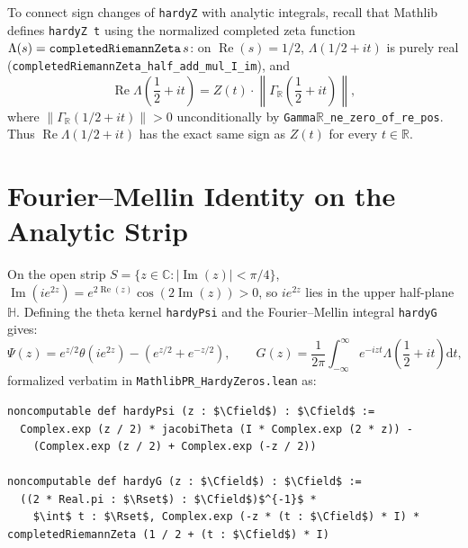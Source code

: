\documentclass[11pt,a4paper]{article}
\theoremstyle{definition}
\newcommand{\dee}{\mathrm{d}}
\newcommand{\Rset}{\mathbb{R}}
\newcommand{\Cfield}{\mathbb{C}}
\begin{document}
To connect sign changes of \texttt{hardyZ} with analytic integrals, recall that Mathlib defines \texttt{hardyZ t} using the normalized completed zeta function $\Lambda(s) = \text{\texttt{completedRiemannZeta}}\, s$: on $\operatorname{Re}(s) = 1/2$, $\Lambda(1/2 + it)$ is purely real (\texttt{completedRiemannZeta\_\allowbreak half\_\allowbreak add\_\allowbreak mul\_I\_im}), and
\begin{equation}\label{eq:lambda_hardyZ}
\operatorname{Re}\Lambda\!\left(\frac{1}{2} + it\right) = Z(t) \cdot \left\|\Gamma_{\Rset}\!\left(\frac{1}{2} + it\right)\right\|,
\end{equation}
where $\|\Gamma_{\Rset}(1/2 + it)\| > 0$ unconditionally by \texttt{Gamma$\Rset$\_ne\_zero\_of\_re\_pos}. Thus $\operatorname{Re}\Lambda(1/2+it)$ has the exact same sign as $Z(t)$ for every $t \in \Rset$.

\section{Fourier--Mellin Identity on the Analytic Strip}\label{sec:strip}

On the open strip $S = \{z \in \Cfield : |\operatorname{Im}(z)| < \pi/4\}$, $\operatorname{Im}(i e^{2z}) = e^{2\operatorname{Re}(z)}\cos(2\operatorname{Im}(z)) > 0$, so $i e^{2z}$ lies in the upper half-plane $\mathbb{H}$. Defining the theta kernel \texttt{hardyPsi} and the Fourier--Mellin integral \texttt{hardyG} gives:
\begin{equation}
\Psi(z) = e^{z/2} \theta\!\left(i e^{2z}\right) - \left(e^{z/2} + e^{-z/2}\right), \qquad
G(z) = \frac{1}{2\pi} \int_{-\infty}^{\infty} e^{-i z t} \Lambda\!\left(\frac{1}{2} + it\right)\dee t,
\end{equation}
formalized verbatim in \texttt{MathlibPR\_\allowbreak HardyZeros.lean} as:
\begin{lstlisting}
noncomputable def hardyPsi (z : $\Cfield$) : $\Cfield$ :=
  Complex.exp (z / 2) * jacobiTheta (I * Complex.exp (2 * z)) -
    (Complex.exp (z / 2) + Complex.exp (-z / 2))

noncomputable def hardyG (z : $\Cfield$) : $\Cfield$ :=
  ((2 * Real.pi : $\Rset$) : $\Cfield$)$^{-1}$ *
    $\int$ t : $\Rset$, Complex.exp (-z * (t : $\Cfield$) * I) * completedRiemannZeta (1 / 2 + (t : $\Cfield$) * I)
\end{lstlisting}
\end{document}
